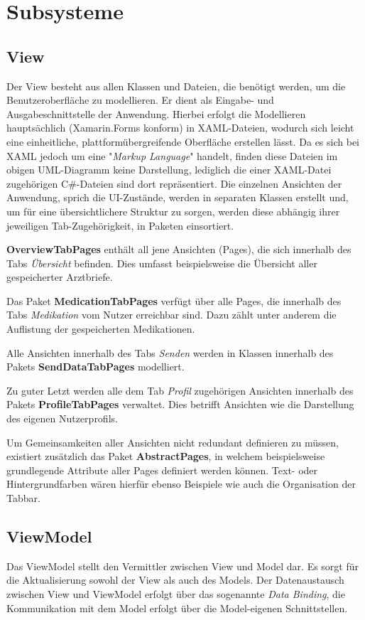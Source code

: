 \documentclass[a4paper]{scrreprt}
\begin{document}
\section{Subsysteme}
\subsection{View}
Der View besteht aus allen Klassen und Dateien, die benötigt werden, um die Benutzeroberfläche zu modellieren. Er dient als Eingabe- und Ausgabeschnittstelle der Anwendung.
Hierbei erfolgt die Modellieren hauptsächlich (Xamarin.Forms konform) in XAML-Dateien, wodurch sich leicht eine einheitliche, plattformübergreifende Oberfläche erstellen lässt. Da es sich bei XAML jedoch um eine "\textit{Markup Language}" handelt, finden diese Dateien im obigen UML-Diagramm keine Darstellung, lediglich die einer XAML-Datei zugehörigen C\#-Dateien sind dort repräsentiert.
Die einzelnen Ansichten der Anwendung, sprich die UI-Zustände, werden in separaten Klassen erstellt und, um für eine übersichtlichere Struktur zu sorgen, werden diese abhängig ihrer jeweiligen Tab-Zugehörigkeit, in Paketen einsortiert.

\textbf{OverviewTabPages} enthält all jene Ansichten (Pages), die sich innerhalb des Tabs \textit{Übersicht} befinden. Dies umfasst beispielsweise die Übersicht aller gespeicherter Arztbriefe.

Das Paket \textbf{MedicationTabPages} verfügt über alle Pages, die innerhalb des Tabs \textit{Medikation} vom Nutzer erreichbar sind. Dazu zählt unter anderem die Auflistung der gespeicherten Medikationen.

Alle Ansichten innerhalb des Tabs \textit{Senden} werden in Klassen innerhalb des Pakets \textbf{SendDataTabPages} modelliert.

Zu guter Letzt werden alle dem Tab \textit{Profil} zugehörigen Ansichten innerhalb des Pakets \textbf{ProfileTabPages} verwaltet. Dies betrifft Ansichten wie die Darstellung des eigenen Nutzerprofils.

Um Gemeinsamkeiten aller Ansichten nicht redundant definieren zu müssen, existiert zusätzlich das Paket \textbf{AbstractPages}, in welchem beispielsweise grundlegende Attribute aller Pages definiert werden können. Text- oder Hintergrundfarben wären hierfür ebenso Beispiele wie auch die Organisation der Tabbar.

\subsection{ViewModel}
Das ViewModel stellt den Vermittler zwischen View und Model dar. Es sorgt für die Aktualisierung sowohl der View als auch des Models. Der Datenaustausch zwischen View und ViewModel erfolgt über das sogenannte \textit{Data Binding}, die Kommunikation mit dem Model erfolgt über die Model-eigenen Schnittstellen.
\end{document}
